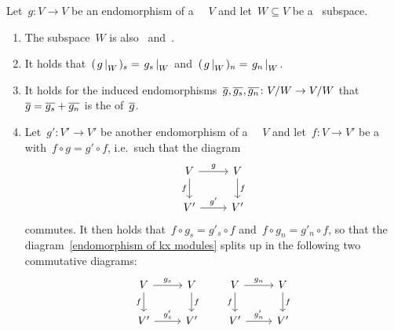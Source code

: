 \begin{lemma}
  \label{properties of jcd}
  Let~$g \colon V \to V$ be an endomorphism of a ~~$V$ and let~$W \subseteq V$ be a~ subspace.
  \begin{enumerate}
    \item
      The subspace~$W$ is also~ and~.
    \item
      \label{restriction of jcd}
      It holds that~$(\restrict*{g}{W})_s = \restrict*{g_s}{W}$ and~$(\restrict*{g}{W})_n = \restrict*{g_n}{W}$.
    \item
      \label{induced jcd}
      It holds for the induced endomorphisms~$\overline{g}, \overline{g_s}, \overline{g_n} \colon V/W \to V/W$ that~$\overline{g} = \overline{g_s} + \overline{g_n}$ is the {\JCD} of~$\overline{g}$.
    \item
      Let~$g' \colon V' \to V'$ be another endomorphism of a ~~$V$ and let~$f \colon V \to V'$ be a~ with~$f \circ g = g' \circ f$, i.e.\ such that the diagram
      \begin{equation}
        \label{endomorphism of kx modules}
        \begin{tikzcd}
            V
            \arrow{r}[above]{g}
            \arrow{d}[left]{f}
          & V
            \arrow{d}[right]{f}
          \\
            V'
            \arrow{r}[above]{g'}
          & V'
        \end{tikzcd}
      \end{equation}
      commutes.
      It then holds that~$f \circ g_s = g'_s \circ f$ and~$f \circ g_n = g'_n \circ f$, so that the diagram~\eqref{endomorphism of kx modules} splits up in the following two commutative diagrams:
      \[
        \begin{tikzcd}
            V
            \arrow{r}[above]{g_s}
            \arrow{d}[left]{f}
          & V
            \arrow{d}[right]{f}
          \\
            V'
            \arrow{r}[above]{g'_s}
          & V'
        \end{tikzcd}
        \qquad
        \begin{tikzcd}
            V
            \arrow{r}[above]{g_n}
            \arrow{d}[left]{f}
          & V
            \arrow{d}[right]{f}
          \\
            V'
            \arrow{r}[above]{g'_n}
          & V'
        \end{tikzcd}
      \]
  \end{enumerate}
\end{lemma}


